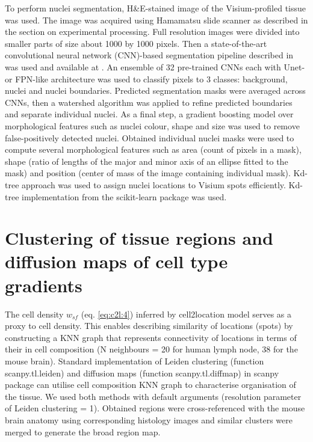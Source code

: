 \documentclass[11pt,a4paper]{article}
\begin{document}
To perform nuclei segmentation, H&E-stained image of the Visium-profiled tissue was used. The image was acquired using Hamamatsu slide scanner as described in the section on experimental processing. Full resolution images were divided into smaller parts of size about 1000 by 1000 pixels. Then a state-of-the-art convolutional neural network (CNN)-based segmentation pipeline described in \cite{caicedo_nucleus_2019} was used and available at \cite{'https://github.com/selimsef/dsb2018_topcoders'}. An ensemble of 32 pre-trained CNNs each with Unet- or FPN-like architecture was used to classify pixels to 3 classes: background, nuclei and nuclei boundaries. Predicted segmentation masks were averaged across CNNs, then a watershed algorithm was applied to refine predicted boundaries and separate individual nuclei. As a final step, a gradient boosting model over morphological features such as nuclei colour, shape and size was used to remove false-positively detected nuclei.  
Obtained individual nuclei masks were used to compute several morphological features such as area (count of pixels in a mask), shape (ratio of lengths of the major and minor axis of an ellipse fitted to the mask) and position (center of mass of the image containing individual mask).
Kd-tree approach was used to assign nuclei locations to Visium spots efficiently. Kd-tree implementation from the scikit-learn package was used.


\section{Clustering of tissue regions and diffusion maps of cell type gradients} \label{auto_clustering}

The cell density $w_{sf}$ (eq. \ref{eq:c2l:4}) inferred by cell2location model serves as a proxy to cell density. This enables describing similarity of locations (spots) by constructing a KNN graph that represents connectivity of locations in terms of their in cell composition (N neighbours = 20 for human lymph node, 38 for the mouse brain). Standard implementation of Leiden clustering (function scanpy.tl.leiden) and diffusion maps (function scanpy.tl.diffmap) in scanpy package \cite{wolf_scanpy_2018} can utilise cell composition KNN graph to characterise organisation of the tissue. We used both methods with default arguments (resolution parameter of Leiden clustering = 1). Obtained regions were cross-referenced with the mouse brain anatomy using corresponding histology images and similar clusters were merged to generate the broad region map.
\end{document}
